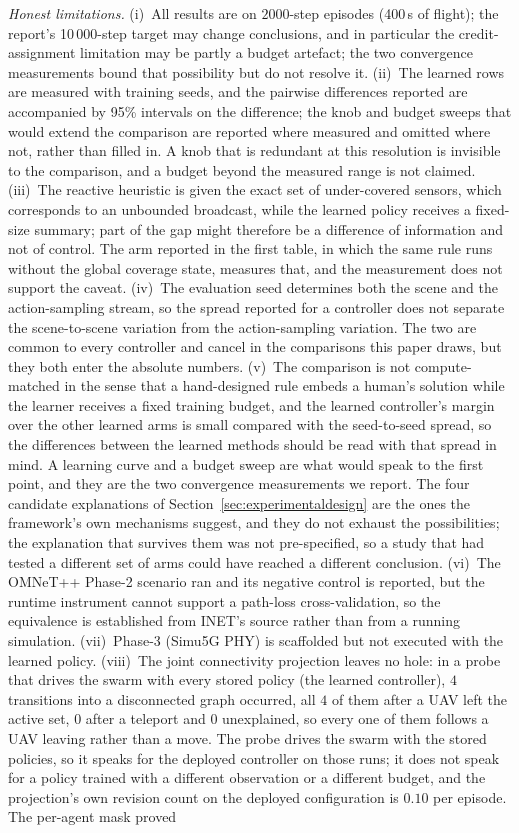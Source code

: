 \documentclass[conference]{IEEEtran}
\newcommand{\tokConnAllLeaving}{every one of them follows a UAV leaving rather than a move}
\newcommand{\tokConnAsc}{4}
\newcommand{\tokConnPolicy}{every stored policy (the learned controller)}
\newcommand{\tokConnSteps}{4}
\newcommand{\tokConnTele}{0}
\newcommand{\tokConnUnexplained}{0}
\newcommand{\tokEpisodeSeconds}{400}
\newcommand{\tokEpisodeSteps}{2000}
\newcommand{\tokProjRevisions}{0.10}
\begin{document}
\emph{Honest limitations.} (i)~All results are on $\tokEpisodeSteps$-step episodes (\tokEpisodeSeconds\,s of flight); the report's 10\,000-step target may change conclusions, and in particular the credit-assignment limitation may be partly a budget artefact; the two convergence measurements bound that possibility but do not resolve it. (ii)~The learned rows are measured with \tokEgoShapeN{} training seeds, and the pairwise differences reported are accompanied by 95\% intervals on the difference; the knob and budget sweeps that would extend the comparison are reported where measured and omitted where not, rather than filled in.  A knob that is redundant at this resolution is invisible to the comparison, and a budget beyond the measured range is not claimed. (iii)~The reactive heuristic is given the exact set of under-covered sensors, which corresponds to an unbounded broadcast, while the learned policy receives a fixed-size summary; part of the gap might therefore be a difference of information and not of control.  The arm reported in the first table, in which the same rule runs without the global coverage state, measures that, and the measurement does not support the caveat. (iv)~The evaluation seed determines both the scene and the action-sampling stream, so the spread reported for a controller does not separate the scene-to-scene variation from the action-sampling variation. The two are common to every controller and cancel in the comparisons this paper draws, but they both enter the absolute numbers. (v)~The comparison is not compute-matched in the sense that a hand-designed rule embeds a human's solution while the learner receives a fixed training budget, and the learned controller's margin over the other learned arms is small compared with the seed-to-seed spread, so the differences between the learned methods should be read with that spread in mind. A learning curve and a budget sweep are what would speak to the first point, and they are the two convergence measurements we report. The four candidate explanations of Section~\ref{sec:experimentaldesign} are the ones the framework's own mechanisms suggest, and they do not exhaust the possibilities; the explanation that survives them was not pre-specified, so a study that had tested a different set of arms could have reached a different conclusion. (vi)~The OMNeT++ Phase-2 scenario ran and its negative control is reported, but the runtime instrument cannot support a path-loss cross-validation, so the equivalence is established from INET's source rather than from a running simulation. (vii)~Phase-3 (Simu5G PHY) is scaffolded but not executed with the learned policy. (viii)~The joint connectivity projection leaves no hole: in a probe that drives the swarm with \tokConnPolicy{}, $\tokConnSteps$ transitions into a disconnected graph occurred, all $\tokConnAsc$ of them after a UAV left the active set, $\tokConnTele$ after a teleport and $\tokConnUnexplained$ unexplained, so \tokConnAllLeaving.  The probe drives the swarm with the stored policies, so it speaks for the deployed controller on those runs; it does not speak for a policy trained with a different observation or a different budget, and the projection's own revision count on the deployed configuration is $\tokProjRevisions$ per episode. The per-agent mask proved 
\end{document}
